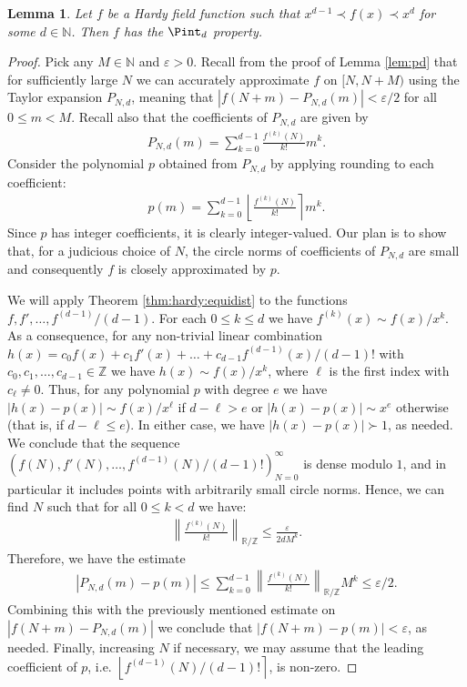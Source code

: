 \documentclass{amsart}
\newtheorem{lemma}[theorem]{Lemma}
\theoremstyle{definition}
\newcommand{\nint}[1]{\left\lfloor #1 \right\rceil}
\newcommand{\fpa}[1]{\left\lVert #1 \right\rVert_{\RR/\ZZ}}
\newcommand{\bra}[1]{\left( #1 \right)}
\newcommand{\abs}[1]{\left|#1\right|}
\newcommand{\e}{\varepsilon}
\newcommand{\NN}{\mathbb{N}}
\newcommand{\ZZ}{\mathbb{Z}}
\newcommand{\RR}{\mathbb{R}}
\begin{document}
\begin{lemma}\label{lem:pint}
Let $f$ be a Hardy field function such that $x^{{ d-1}} \prec f(x) \prec x^{{ d}}$ for some $d \in \NN$. Then $f$ has the $\Pint_d$ property.
\end{lemma}
\begin{proof}
	Pick any $M \in \NN$ and $\e > 0$. Recall from the proof of Lemma \ref{lem:pd} that for sufficiently large $N$ we can accurately approximate $f$ on $[N,N+M)$ using the Taylor expansion $P_{N, { d}}$, meaning that $\abs{f(N+m)-P_{N,{ d}}(m)} < \e/2$ for all $0 \leq m < M$. Recall also that the coefficients of $P_{N,{ d}}$ are given by
	\begin{align*}
		P_{N,{ d}}(m) = \sum_{k=0}^{{ d-1}} \frac{f^{(k)}(N)}{k!} m^k.
	\end{align*}
Consider the polynomial $p$ obtained from $P_{N,{ d}}$ by applying rounding to each coefficient:	
	\begin{align*}
		p(m) = \sum_{k=0}^{{ d-1}} \nint{ \frac{f^{(k)}(N)}{k!} } m^k.
	\end{align*}	
	Since $p$ has integer coefficients, it is clearly integer-valued. Our plan is to show that, for a judicious choice of $N$, the circle norms of coefficients of $P_{N,{ d}}$ are small and consequently $f$ is closely approximated by $p$. 
	
	We will apply Theorem \ref{thm:hardy:equidist} to the functions $f, f', \dots, f^{(d-1)}/(d-1)$. For each $0 \leq k \leq d$ we have $f^{(k)}(x) \sim f(x)/x^k$. As a consequence, for any non-trivial linear combination $h(x) = c_0 f(x) + c_1 f'(x) + \dots + c_{d-1} f^{(d-1)}(x)/(d-1)!$ with $c_0,c_1,\dots,c_{d-1} \in \ZZ$ we have $h(x) \sim f(x)/x^k$, where $\ell$ is the first index with $c_\ell \neq 0$. Thus, for any polynomial $p$ with degree $e$ we have $\abs{ h(x) - p(x)} \sim f(x)/x^\ell$ if $d-\ell > e$ or $\abs{ h(x) - p(x)} \sim x^e$ otherwise (that is, if $d-\ell \leq e$). In either case, we have $\abs{ h(x) - p(x)} \succ 1$, as needed. We conclude that the sequence $\bra{f(N), f'(N), \dots, f^{(d-1)}(N)/(d-1)!}_{N=0}^\infty$ is dense modulo $1$, and in particular it includes points with arbitrarily small circle norms. Hence, we can find $N$ such that for all $0 \leq k < d$ we have:
\begin{align*}
		\fpa{\frac{f^{(k)}(N)}{k!} } \leq \frac{\e}{2{ d}M^k}.
\end{align*}	  
Therefore, we have the estimate
\begin{align*}
	\abs{P_{N,{ d}}(m) - p(m)} \leq \sum_{k=0}^{{ d-1}} \fpa{\frac{f^{(k)}(N)}{k!} } M^k \leq \e/2.
\end{align*} 
Combining this with the previously mentioned estimate on $\abs{f(N+m)-P_{N,{ d}}(m)} $ we conclude that $\abs{f(N+m)-p(m)} < \e$, as needed. Finally, increasing $N$ if necessary, we may assume that the leading coefficient of $p$, i.e. $\nint{f^{(d-1)}(N)/(d-1)!}$, is non-zero.
\end{proof}
\end{document}
